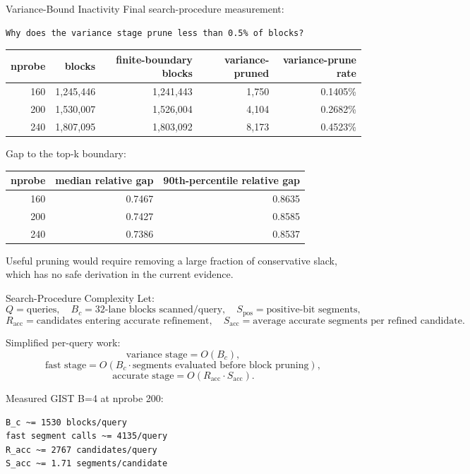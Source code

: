 \documentclass[aspectratio=169,10pt]{beamer}
\begin{document}
\begin{frame}[fragile]{Variance-Bound Inactivity}
\scriptsize
Final search-procedure measurement:
\begin{lstlisting}
Why does the variance stage prune less than 0.5% of blocks?
\end{lstlisting}

\begin{tabular}{rrrrr}
\toprule
nprobe & blocks & finite-boundary blocks & variance-pruned & variance-prune rate \\
\midrule
160 & 1,245,446 & 1,241,443 & 1,750 & 0.1405\% \\
200 & 1,530,007 & 1,526,004 & 4,104 & 0.2682\% \\
240 & 1,807,095 & 1,803,092 & 8,173 & 0.4523\% \\
\bottomrule
\end{tabular}

\vspace{0.8em}
Gap to the top-k boundary:

\begin{tabular}{rrr}
\toprule
nprobe & median relative gap & 90th-percentile relative gap \\
\midrule
160 & 0.7467 & 0.8635 \\
200 & 0.7427 & 0.8585 \\
240 & 0.7386 & 0.8537 \\
\bottomrule
\end{tabular}

\vspace{0.8em}
\small
Useful pruning would require removing a large fraction of conservative slack,
which has no safe derivation in the current evidence.
\end{frame}

\begin{frame}[fragile]{Search-Procedure Complexity}
\small
Let:
\[
Q=\text{queries},\quad
B_c=\text{32-lane blocks scanned/query},\quad
S_{\mathrm{pos}}=\text{positive-bit segments},
\]
\[
R_{\mathrm{acc}}=\text{candidates entering accurate refinement},\quad
S_{\mathrm{acc}}=\text{average accurate segments per refined candidate}.
\]

Simplified per-query work:
\[
\text{variance stage}=O(B_c),
\]
\[
\text{fast stage}=O(B_c\cdot\text{segments evaluated before block pruning}),
\]
\[
\text{accurate stage}=O(R_{\mathrm{acc}}\cdot S_{\mathrm{acc}}).
\]

Measured GIST B=4 at nprobe 200:
\begin{lstlisting}
B_c ~= 1530 blocks/query
fast segment calls ~= 4135/query
R_acc ~= 2767 candidates/query
S_acc ~= 1.71 segments/candidate
\end{lstlisting}
\end{frame}
\end{document}
